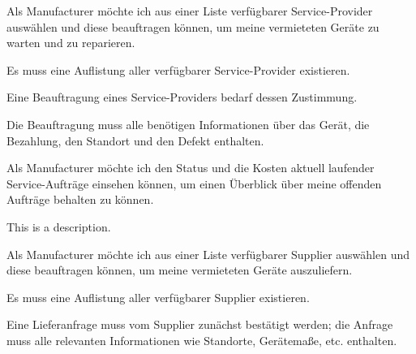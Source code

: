 \begin{tcolorbox}[colback=white,colframe=MidnightBlue!50!black, colbacktitle=MidnightBlue!75!black,title=\textbf{\underline{M7} Service-Provider beauftragen}]
  \label{req:m7}
  \glqq Als Manufacturer möchte ich aus einer Liste verfügbarer Service-Provider auswählen und diese beauftragen können, um meine vermieteten Geräte zu warten und zu reparieren. \grqq
  \tcblower
  \begin{tcolorbox}[colback=white,colframe=white!50!black, colbacktitle=white!75!black,title=Task M7.1]
    Es muss eine Auflistung aller verfügbarer Service-Provider existieren.
  \end{tcolorbox}
  \begin{tcolorbox}[colback=white,colframe=white!50!black, colbacktitle=white!75!black,title=Task M7.2]
    Eine Beauftragung eines Service-Providers bedarf dessen Zustimmung.
  \end{tcolorbox}
  \begin{tcolorbox}[colback=white,colframe=white!50!black, colbacktitle=white!75!black,title=Task M7.3]
    Die Beauftragung muss alle benötigen Informationen über das Gerät, die Bezahlung, den Standort und den Defekt enthalten.
  \end{tcolorbox}
\end{tcolorbox}

\begin{tcolorbox}[colback=white,colframe=MidnightBlue!50!black, colbacktitle=MidnightBlue!75!black,title=\textbf{\underline{M8} Service-Aufträge einsehen}]
  \label{req:m8}
  \glqq Als Manufacturer möchte ich den Status und die Kosten aktuell laufender Service-Aufträge einsehen können, um einen Überblick über meine offenden Aufträge behalten zu können. \grqq
  \tcblower
  \begin{tcolorbox}[colback=white,colframe=white!50!black, colbacktitle=white!75!black,title=Task M8.1]
    This is a description.
  \end{tcolorbox}
\end{tcolorbox}

\begin{tcolorbox}[colback=white,colframe=MidnightBlue!50!black, colbacktitle=MidnightBlue!75!black,title=\textbf{\underline{M9} Lierferungen beauftragen}]
  \label{req:m9}
  \glqq Als Manufacturer möchte ich aus einer Liste verfügbarer Supplier auswählen und diese beauftragen können, um meine vermieteten Geräte auszuliefern. \grqq
  \tcblower
  \begin{tcolorbox}[colback=white,colframe=white!50!black, colbacktitle=white!75!black,title=Task M9.1]
    Es muss eine Auflistung aller verfügbarer Supplier existieren.
  \end{tcolorbox}
  \begin{tcolorbox}[colback=white,colframe=white!50!black, colbacktitle=white!75!black,title=Task M9.2]
    Eine Lieferanfrage muss vom Supplier zunächst bestätigt werden; die Anfrage muss alle relevanten Informationen wie Standorte, Gerätemaße, etc. enthalten.
  \end{tcolorbox}
\end{tcolorbox}

